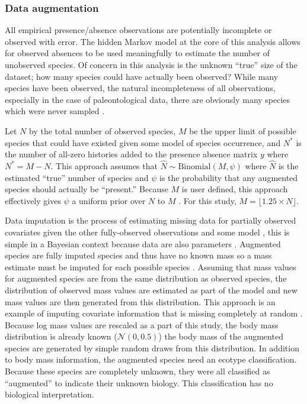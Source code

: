 \documentclass[12pt,letterpaper]{article}
\begin{document}
\subsubsection*{Data augmentation}
All empirical presence/absence observations are potentially incomplete or observed with error. The hidden Markov model at the core of this analysis allows for observed absences to be used meaningfully to estimate the number of unobserved species. Of concern in this analysis is the unknown ``true'' size of the dataset; how many species could have actually been observed? While many species have been observed, the natural incompleteness of all observations, especially in the case of paleontological data, there are obviously many species which were never sampled \citep{Royle2008,Royle2007a}.

Let \(N\) by the total number of observed species, \(M\) be the upper limit of possible species that could have existed given some model of species occurrence, and \(N^{\ast}\) is the number of all-zero histories added to the presence absence matrix \(y\) where \(N^{\ast} = M - N\). This approach assumes that \(\hat{N} \sim \text{Binomial}(M, \psi)\) where \(\hat{N}\) is the estimated ``true'' number of species and \(\psi\) is the probability that any augmented species should actually be ``present.'' Because \(M\) is user defined, this approach effectively gives \(\psi\) a uniform prior over \(N\) to \(M\) \citep{Royle2008}. For this study, \(M = \lfloor{1.25 \times N\rfloor}\).

Data imputation is the process of estimating missing data for partially observed covariates given the other fully-observed observations and some model \citep{Gelman2007,Rubin1996}, this is simple in a Bayesian context because data are also parameters \citep{Gelman2013d}. Augmented species are fully imputed species and thus have no known mass so a mass estimate must be imputed for each possible species \citep{Royle2012b}. Assuming that mass values for augmented species are from the same distribution as observed species, the distribution of observed mass values are estimated as part of the model and new mass values are then generated from this distribution. This approach is an example of imputing covariate information that is missing completely at random \citep{Gelman2007,Royle2012b}. Because log mass values are rescaled as a part of this study, the body mass distribution is already known (\(\mathcal{N}(0, 0.5)\)) the body mass of the augmented species are generated by simple random draws from this distribution. In addition to body mass information, the augmented species need an ecotype classification. Because these species are completely unknown, they were all classified as ``augmented'' to indicate their unknown biology. This classification has no biological interpretation.
\end{document}
